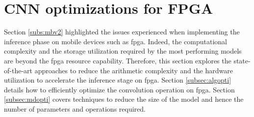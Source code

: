 \section{CNN optimizations for FPGA} \label{sec:opti_cnn}
%
%
Section \ref{subs:mbv2} highlighted the issues experienced when implementing the inference phase on mobile devices such as \acrshort{fpga}. Indeed, the computational complexity and the storage utilization required by the most performing models are beyond the \acrshort{fpga} resource capability. Therefore, this section explores the state-of-the-art approaches to reduce the arithmetic complexity and the hardware utilization to accelerate the inference stage on \acrshort{fpga}. Section \ref{subsec:algopti} details how to efficiently optimize the convolution operation on \acrshort{fpga}. Section \ref{subsec:mdopti} covers techniques to reduce the size of the model and hence the number of parameters and operations required.
%

%

